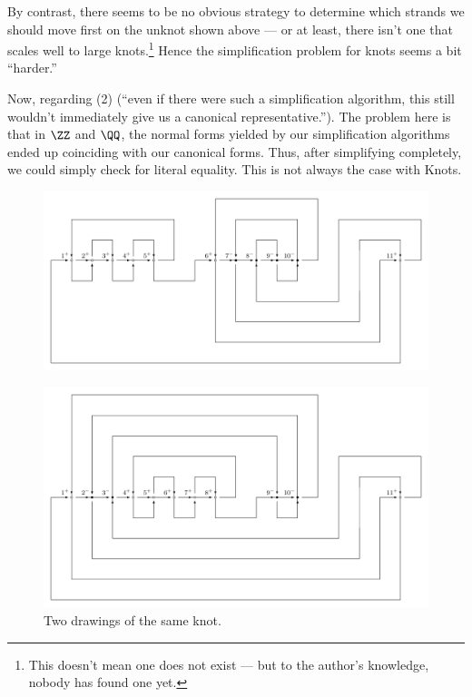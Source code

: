 By contrast, there seems to be no obvious strategy to determine which
strands we should move first on the unknot shown above --- or at
least, there isn't one that scales well to large knots.\footnote{This
  doesn't mean one does not exist --- but to the author's knowledge,
  nobody has found one yet.} Hence the simplification problem for
knots seems a bit ``harder.''

Now, regarding (2) (``even if there were such a simplification
algorithm, this still wouldn't immediately give us a canonical
representative.''). The problem here is that in $\ZZ$ and $\QQ$, the
normal forms yielded by our simplification algorithms ended up
coinciding with our canonical forms. Thus, after simplifying
completely, we could simply check for literal equality. This is not
always the case with Knots.%
\begin{figure}[H]
  \centering
  \includegraphics[scale=.6]{figures/fundamentals/sum-at-0.pdf}
\end{figure}
\begin{figure}[H]
  \centering
  \includegraphics[scale=.6]{figures/fundamentals/sum-at-3.pdf}
  \caption{Two drawings of the same knot.}
\end{figure}
